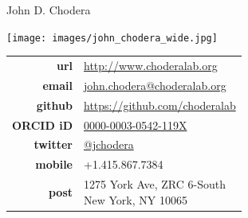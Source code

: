 \documentclass[10pt]{article}
\begin{document}
\reversemarginpar
{\selectfont \LARGE John D. Chodera}\\[1cm]

\vspace{-0.5in}

\begin{minipage}[t]{2.5in}
\texttt{[image: images/john\_chodera\_wide.jpg]} %
\end{minipage}
\quad
\begin{minipage}[t]{3in}
\small
\begin{tabular}{rl}
{\bf url} & \href{http://www.choderalab.org}{http://www.choderalab.org}\\[0.05in]
{\bf email} & \href{mailto:john.chodera@choderalab.org}{john.chodera@choderalab.org}\\[0.05in] 
{\bf github} & \href{https://github.com/choderalab}{https://github.com/choderalab}\\[0.05in]
{\bf ORCID iD} & \href{http://orcid.org/0000-0003-0542-119X}{0000-0003-0542-119X}\\[0.05in]
{\bf twitter} & \href{http://twitter.com/jchodera}{@jchodera}\\[0.05in]
{\bf mobile} & +1.415.867.7384\\[0.05in]
{\bf post} & 
\parbox[t]{3.0in}{%
1275 York Ave, ZRC 6-South\\
New York, NY 10065}
\end{tabular}
\end{minipage}

\end{document}
